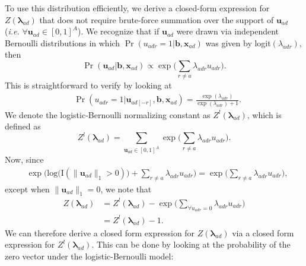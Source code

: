 \documentclass[ba]{imsart}
\numberwithin{equation}{section}
\theoremstyle{plain}
\begin{document}
	To use this distribution efficiently, we derive a closed-form expression for $Z(\boldsymbol{\lambda}_{ad})$ that does not require brute-force summation over the support of $\boldsymbol{u}_{ad}$ (\textit{i.e.} $\forall \boldsymbol{u}_{ad} \in [0,1]^A$). We recognize that if $\boldsymbol{u}_{ad}$ were drawn via independent Bernoulli distributions in which $\Pr({u}_{adr}=1|\boldsymbol{b}, \boldsymbol{x}_{ad})$ was given by logit$(\lambda_{adr})$, then 
	\begin{equation*}
	\Pr(\boldsymbol{u}_{ad}|\boldsymbol{b}, \boldsymbol{x}_{ad}) \propto \exp\Big(\sum_{r \neq a } \lambda_{adr}u_{adr}\Big).  	 
	\end{equation*}
	This is straightforward to verify by looking at 
	\begin{equation*}
	\begin{aligned}
	&\Pr(u_{adr}=1|\boldsymbol{u}_{ad[-r]}, \boldsymbol{b}, \boldsymbol{x}_{ad})
	=\frac{\exp{(\lambda_{adr})}}{\exp{(\lambda_{adr})} + 1}.
	\end{aligned}\end{equation*}
	We denote the logistic-Bernoulli normalizing constant as $Z^{l}(\boldsymbol{\lambda}_{ad})$, which is defined as 
	\begin{equation*}
	Z^{l}( \boldsymbol{\lambda}_{ad})=\sum_{\boldsymbol{u}_{ad} \in [0,1]^{A}} \exp\Big(\sum_{r\neq a} \lambda_{adr}u_{adr}\Big).
	\end{equation*}
	Now, since 
	\begin{equation*}
	\begin{aligned}
	&\exp\Big(\mbox{log}\Big(\text{I}(\lVert \boldsymbol{u}_{ad} \rVert_1 > 0)\Big) + \sum_{r \neq a} \lambda_{adr}u_{adr} \Big)= \exp\Big( \sum_{r \neq a} \lambda_{adr}u_{adr} \Big),
	\end{aligned}
	\end{equation*}
	except when $\lVert \boldsymbol{u}_{ad} \rVert_1=0$, we note that 
	\begin{equation*}
	\begin{aligned}
	Z(\boldsymbol{\lambda}_{ad})& = Z^{l}(\boldsymbol{\lambda}_{ad}) -\exp\Big( \sum\limits_{\forall u_{adr}=0}\lambda_{adr}u_{adr} \Big)
	\\& = Z^{l}(\boldsymbol{\lambda}_{ad}) -  1.
	\end{aligned}
	\end{equation*}
	We can therefore derive a closed form expression for $Z(\boldsymbol{\lambda}_{ad})$ via a closed form expression for $Z^{l}(\boldsymbol{\lambda}_{ad})$. This can be done by looking at the probability of the zero vector under the logistic-Bernoulli model:
\end{document}

